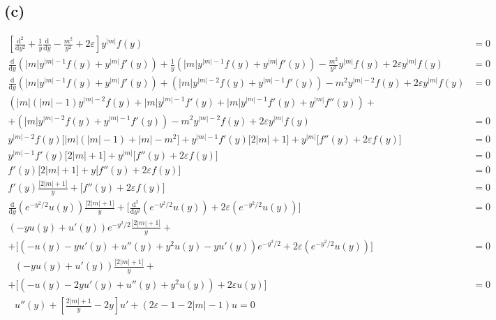 \documentclass[letter, 10pts]{article}
\begin{document}
\subsection*{(c)}
\begin{align*}
\left[
\frac{\mathrm{d} ^2}{\mathrm{d} y^2}
+ 
\frac{1}{y} \frac{\mathrm{d} }{\mathrm{d} y}
- 
\frac{m^2}{y^2}
+ 
2 \varepsilon 
\right]
y^{|m|}f(y)
&= 0 
\\
\frac{\mathrm{d} }{\mathrm{d} y}
\left(
|m|y^{|m| - 1} f(y) + y^{|m|} f'(y)
\right)
+ \frac{1}{y} \left(
|m|y^{|m| - 1} f(y) + y^{|m|} f'(y)
\right)
- \frac{m^2}{y^2} y^{|m|}f(y) 
	+ 2 \varepsilon y^{|m|}f(y) &= 0
\\
\frac{\mathrm{d} }{\mathrm{d} y}
\left(
|m|y^{|m| - 1} f(y) + y^{|m|} f'(y)
\right)
+ \left(
|m|y^{|m| - 2} f(y) + y^{|m|-1} f'(y)
\right)
- m^2 y^{|m| - 2 }f(y) 
	+ 2 \varepsilon y^{|m|}f(y) &= 0
\\
\left(
|m|(|m| - 1 ) y^{|m| - 2} f(y) 
+ |m| y^{|m| - 1} f'(y) + 
|m| y^{|m| - 1} f'(y)
+ 
y^{|m|}f''(y) 
\right) + \\ 
+ \left(
|m|y^{|m| - 2} f(y) + y^{|m|-1} f'(y)
\right)
- m^2 y^{|m| - 2 }f(y) 
	+ 2 \varepsilon y^{|m|}f(y) &= 0
	\\
y^{|m| - 2} f(y)
\Big[
|m| (|m| - 1)  +
|m|  
- 
m^2  
\Big]
+
y^{|m| - 1}  f'(y)
\Big[
2 |m| + 1 
\Big]
+ 
y^{|m|} 
\Big[
f''(y) + 2 \varepsilon f(y)
\Big] &= 0 \\
y^{|m| - 1}  f'(y)
\Big[
2 |m| + 1 
\Big]
+ 
y^{|m|} 
\Big[
f''(y) + 2 \varepsilon f(y)
\Big] &= 0 \\
f'(y)
\Big[
2 |m| + 1 
\Big]
+ 
y
\Big[
f''(y) + 2 \varepsilon f(y)
\Big] &= 0 \\
f'(y)
\frac{\Big[
2 |m| + 1 
\Big]}{y}
+ 
\Big[
f''(y) + 2 \varepsilon f(y)
\Big] &= 0 \\
\frac{\mathrm{d} }{\mathrm{d} y} 
\left(
e^{- y^2 / 2} u(y) 
\right)
\frac{\Big[
2 |m| + 1 
\Big]}{y}
+ 
\Big[
\frac{\mathrm{d} ^2}{\mathrm{d} y^2} 
\left(
e^{ - y^2 / 2 } u(y) 
\right)+ 2 \varepsilon 
\left(e^{ - y^2 / 2} u(y) \right)
\Big] &= 0 \\
\left(
- y  u(y) +  u'(y) 
\right)e^{ - y^2 / 2}
\frac{\Big[
2 |m| + 1 
\Big]}{y}+  \\ 
+ 
\Big[
\left(
	-u(y) - y u'(y) + u''(y) + y^2 u(y) - y u'(y)  
\right)e^{ - y^2 / 2 } 
+ 2 \varepsilon 
\left(e^{ - y^2 / 2} u(y) \right)
\Big] &= 0 \\
\
\
\
\left(
- y  u(y) +  u'(y) 
\right) 
\frac{\Big[
2 |m| + 1 
\Big]}{y}+  \\ 
+ 
\Big[
\left(
	-u(y) - 2 y u'(y) + u''(y) + y^2 u(y) 
\right) 
+ 2 \varepsilon 
u(y) 
\Big] &= 0 \\
\
\
\
u''(y)+
\left[
\frac{2|m| + 1}{y} - 2y 	
\right] u'
+ 
(2 \varepsilon - 1 - 2|m| - 1) u = 0\\ 
\end{align*}
\end{document}
